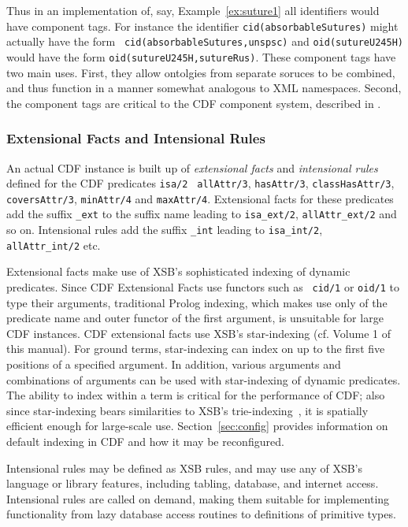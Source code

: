 Thus in an implementation of, say, Example~\ref{ex:suture1} all
identifiers would have component tags.  For instance the identifier
{\tt cid(absorbableSutures)} might actually have the form {\tt
cid(absorbableSutures,unspsc)} and {\tt oid(sutureU245H)} would have
the form {\tt oid(sutureU245H,sutureRus)}.  These component tags have
two main uses.  First, they allow ontolgies from separate soruces to
be combined, and thus function in a manner somewhat analogous to XML
namespaces.  Second, the component tags are critical to the CDF
component system, described in .

\subsubsection{Extensional Facts and Intensional Rules}

 
%
An actual CDF instance is built up of {\em extensional facts} and {\em
intensional rules} defined for the CDF predicates {\tt isa/2} {\tt
allAttr/3}, {\tt hasAttr/3}, {\tt classHasAttr/3}, {\tt coversAttr/3},
{\tt minAttr/4} and {\tt maxAttr/4}.  Extensional facts for these
predicates add the suffix {\tt \_ext} to the suffix name leading to
{\tt isa\_ext/2}, {\tt allAttr\_ext/2} and so on.  Intensional rules
add the suffix {\tt \_int} leading to {\tt isa\_int/2}, {\tt
allAttr\_int/2} etc.

Extensional facts make use of XSB's sophisticated indexing of dynamic
predicates.  Since CDF Extensional Facts use functors such as {\tt
  cid/1} or {\tt oid/1} to type their arguments, traditional Prolog
indexing, which makes use only of the predicate name and outer functor
of the first argument, is unsuitable for large CDF instances.  CDF
extensional facts use XSB's star-indexing (cf. Volume 1 of this
manual).  For ground terms, star-indexing can index on up to the first
five positions of a specified argument.  In addition, various
arguments and combinations of arguments can be used with star-indexing
of dynamic predicates.  The ability to index within a term is critical
for the performance of CDF; also since star-indexing bears
similarities to XSB's trie-indexing~\cite{RRSSW98}, it is spatially
efficient enough for large-scale use.  Section~\ref{sec:config}
provides information on default indexing in CDF and how it may be
reconfigured.

Intensional rules may be defined as XSB rules, and may use any of
XSB's language or library features, including tabling, database, and
internet access.  Intensional rules are called on demand, making them
suitable for implementing functionality from lazy database access
routines to definitions of primitive types.


